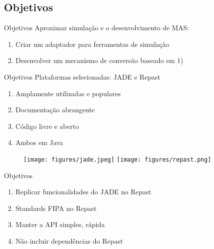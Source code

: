 \subsection{Objetivos}
\begin{frame}{Objetivos}
Aproximar simulação e o desenvolvimento de MAS:
\begin{enumerate}
\item Criar um adaptador para ferramentas de simulação
\item Desenvolver um mecanismo de conversão baseado em 1)
\end{enumerate}
\end{frame}

\begin{frame}{Objetivos}
Plataformas selecionadas: JADE e Repast

\begin{enumerate}
\item Amplamente utilizadas e populares
\item Documentação abrangente
\item Código livre e aberto
\item Ambos em Java
\end{enumerate}

\begin{figure}
	\texttt{[image: figures/jade.jpeg]}
	\hspace{1cm}
	\texttt{[image: figures/repast.png]}
\end{figure}
\end{frame}

\begin{frame}{Objetivos}
\begin{enumerate}
\item Replicar funcionalidades do JADE no Repast
\item Standards FIPA no Repast
\item Manter a API simples, rápida
\item Não incluir dependências do Repast
\end{enumerate}

\end{frame}